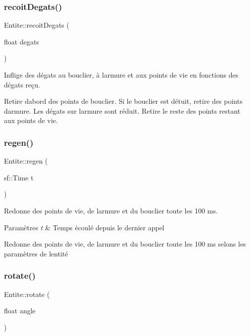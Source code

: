 \subsubsection{\texorpdfstring{recoit\+Degats()}{recoitDegats()}}
{\footnotesize\ttfamily Entite\+::recoit\+Degats (\begin{DoxyParamCaption}\item[{float}]{degats }\end{DoxyParamCaption})}



Inflige des dégats au bouclier, à l\textquotesingle{}armure et aux points de vie en fonctions des dégats reçu. 

Retire d\textquotesingle{}abord des points de bouclier. Si le bouclier est détuit, retire des points d\textquotesingle{}armure. Les dégats sur l\textquotesingle{}armure sont réduit. Retire le reste des points restant aux points de vie. \mbox{\label{class_entite_ac45ceffbeb11cbae7dca26fde5865b85}} 
\subsubsection{\texorpdfstring{regen()}{regen()}}
{\footnotesize\ttfamily Entite\+::regen (\begin{DoxyParamCaption}\item[{sf\+::\+Time}]{t }\end{DoxyParamCaption})}



Redonne des points de vie, de l\textquotesingle{}armure et du bouclier toute les 100 ms. 


\begin{DoxyParams}{Paramètres}
{\em t} & Temps écoulé depuis le dernier appel\\
\hline
\end{DoxyParams}
Redonne des points de vie, de l\textquotesingle{}armure et du bouclier toute les 100 ms selons les paramètres de l\textquotesingle{}entité \mbox{\label{class_entite_af1249039d313e4e691a109440663eae7}} 
\subsubsection{\texorpdfstring{rotate()}{rotate()}}
{\footnotesize\ttfamily Entite\+::rotate (\begin{DoxyParamCaption}\item[{float}]{angle }\end{DoxyParamCaption})}



